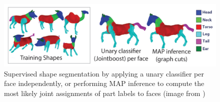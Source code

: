\begin{figure}[t]
\centering
    \includegraphics[width=1.05\columnwidth]{fig/img/segmentation_labeling}
    \vspace{-0.4cm}
    \caption{
	Supervised shape segmentation by applying a unary classifier per face independently, or performing MAP inference to compute the most likely joint assignments of part labels to faces (image from \cite{Kalogerakis:2010:LMS}) }
    \vspace{-0.6cm}
    \label{fig:segmentation_labeling}
\end{figure}


